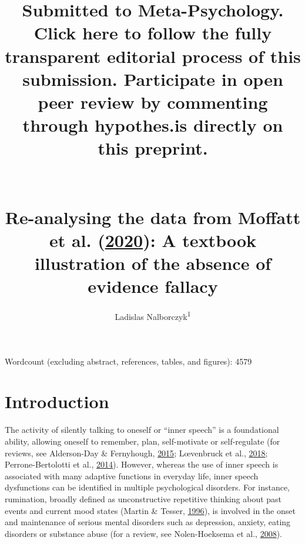 \documentclass[
  english,
  man, donotrepeattitle,floatsintext]{apa6}
\author{Ladislas Nalborczyk\textsuperscript{1}}
\affiliation{
\vspace{0.5cm}
\textsuperscript{1} Univ. Grenoble Alpes, CNRS, Grenoble INP, GIPSA-lab, 38000 Grenoble, France}
\title{\textbf{Submitted to Meta-Psychology. Click here to follow the fully transparent editorial process of this submission. Participate in open peer review by commenting through hypothes.is directly on this preprint.}\\
~\\
~\\
Re-analysing the data from Moffatt et al. (\protect\hyperlink{ref-moffatt_inner_2020}{2020}): A textbook illustration of the absence of evidence fallacy}
\date{}
\begin{document}
\maketitle

Wordcount (excluding abstract, references, tables, and figures): 4579

\newpage

\hypertarget{introduction}{%
\section{Introduction}\label{introduction}}

The activity of silently talking to oneself or ``inner speech'' is a foundational ability, allowing oneself to remember, plan, self-motivate or self-regulate (for reviews, see Alderson-Day \& Fernyhough, \protect\hyperlink{ref-alderson-day_inner_2015}{2015}; Lœvenbruck et al., \protect\hyperlink{ref-loevenbruck_cognitive_2018}{2018}; Perrone-Bertolotti et al., \protect\hyperlink{ref-perrone-bertolotti_what_2014}{2014}). However, whereas the use of inner speech is associated with many adaptive functions in everyday life, inner speech dysfunctions can be identified in multiple psychological disorders. For instance, rumination, broadly defined as unconstructive repetitive thinking about past events and current mood states (Martin \& Tesser, \protect\hyperlink{ref-Martin}{1996}), is involved in the onset and maintenance of serious mental disorders such as depression, anxiety, eating disorders or substance abuse (for a review, see Nolen-Hoeksema et al., \protect\hyperlink{ref-Nolen-Hoeksema2008}{2008}).
\end{document}
